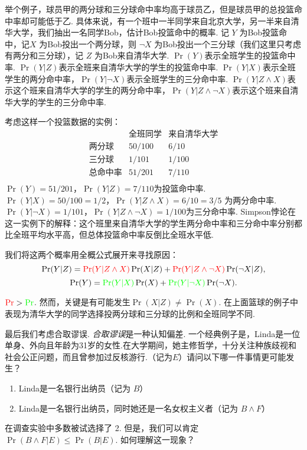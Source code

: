举个例子，球员甲的两分球和三分球命中率均高于球员乙，但是球员甲的总投篮命中率却可能低于乙. 具体来说，有一个班中一半同学来自北京大学，另一半来自清华大学，我们抽出一名同学Bob，估计Bob投篮命中的概率. 记 $Y$ 为Bob投篮命中，记$X$ 为Bob投出一个两分球，则 $\neg X$ 为Bob投出一个三分球（我们这里只考虑有两分和三分球），记 $Z$ 为Bob来自清华大学. $\Pr(Y)$表示全班学生的投篮命中率. $\Pr(Y|Z)$表示全班来自清华大学的学生的投篮命中率. $\Pr(Y|X)$表示全班学生的两分命中率，$\Pr(Y|\neg X)$表示全班学生的三分命中率. $\Pr(Y|Z \wedge X)$表示这个班来自清华大学的学生的两分命中率，$\Pr(Y|Z \wedge \neg X)$表示这个班来自清华大学的学生的三分命中率.

考虑这样一个投篮数据的实例：
    \[
    \begin{array}{c|cc}
          & \text{全班同学} & \text{来自清华大学} \\ \hline
         \text{两分球} & 50/100 & 6/10 \\
         \text{三分球} & 1/101 & 1/100 \\
         \text{总命中率} & 51/201 & 7/110 \\
    \end{array}
    \]
$\Pr(Y) = 51/201$，$\Pr(Y|Z) = 7/110$为投篮命中率. $\Pr(Y|X) = 50/100 = 1/2$，$\Pr(Y|Z \wedge X) = 6/10 = 3/5$ 为两分命中率. $\Pr(Y|\neg X) = 1/101$，$\Pr(Y|Z \wedge \neg X) = 1/100$为三分命中率. Simpson悖论在这一实例下的解释：这个班里来自清华大学的学生两分命中率和三分命中率分别都比全班平均水平高，但总体投篮命中率反倒比全班水平低.

我们将这两个概率用全概公式展开来寻找原因：
$$\Pr(Y|Z) = \textcolor{red}{\Pr(Y|Z\land X)}\Pr(X|Z) + \textcolor{red}{\Pr(Y|Z\wedge\neg X)}\Pr(\neg X|Z),$$
$$\Pr(Y) = \textcolor{green}{\Pr(Y|X)}\Pr(X) +\textcolor{green}{ \Pr(Y|\neg X)}\Pr(\neg X).$$

$\textcolor{red}{\Pr}>\textcolor{green}{\Pr}$. 然而，关键是有可能发生$\Pr(X|Z) \neq \Pr(X)$. 在上面篮球的例子中表现为清华大学的同学选择投两分球和三分球的比例和全班同学不同.

最后我们考虑合取谬误. \emph{合取谬误}是一种认知偏差. 一个经典例子是，Linda是一位单身、外向且年龄为31岁的女性.在大学期间，她主修哲学，十分关注种族歧视和社会公正问题，而且曾参加过反核游行.（记为$E$）请问以下哪一件事情更可能发生？
    \begin{enumerate}
        \item Linda是一名银行出纳员（记为 $B$）
        \item Linda是一名银行出纳员，同时她还是一名女权主义者（记为 $B\wedge F$）
    \end{enumerate}
在调查实验中多数被试选择了 2. 但是，我们可以肯定 $\Pr(B \land F|E) \le \Pr(B|E)$. 如何理解这一现象？

